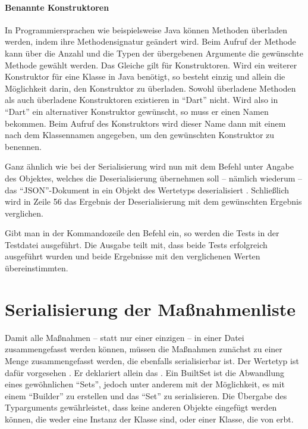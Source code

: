 \paragraph{Benannte Konstruktoren} In Programmiersprachen wie beispielsweise Java können Methoden überladen werden, indem ihre Methodensignatur geändert wird.
Beim Aufruf der Methode kann über die Anzahl und die Typen der übergebenen Argumente die gewünschte Methode gewählt werden.
Das Gleiche gilt für Konstruktoren.
Wird ein weiterer Konstruktor für eine Klasse in Java benötigt, so besteht einzig und allein die Möglichkeit darin, den Konstruktor zu überladen.
Sowohl überladene Methoden als auch überladene Konstruktoren existieren in \enquote{Dart} nicht.
Wird also in \enquote{Dart} ein alternativer Konstruktor gewünscht, so muss er einen Namen bekommen.
Beim Aufruf des Konstruktors wird dieser Name dann mit einem  nach dem Klassennamen angegeben, um den gewünschten Konstruktor zu benennen.


Ganz ähnlich wie bei der Serialisierung wird nun mit dem Befehl    unter Angabe des Objektes,
welches die Deserialisierung übernehmen soll -- nämlich wiederum  -- das \enquote{JSON}-Dokument in ein Objekt des Wertetyps  deserialisiert .
Schließlich wird in Zeile 56 das Ergebnis der Deserialisierung mit dem gewünschten Ergebnis verglichen.



Gibt man in der Kommandozeile den Befehl    ein,
so werden die Tests in der Testdatei ausgeführt.
Die Ausgabe  teilt mit,
dass beide Tests erfolgreich ausgeführt wurden und beide Ergebnisse mit den verglichenen Werten übereinstimmten.

\clearpage
\section{Serialisierung der Maßnahmenliste}

Damit alle Maßnahmen -- statt nur einer einzigen -- in einer Datei zusammengefasst werden können, müssen die Maßnahmen zunächst zu einer Menge zusammengefasst werden, die ebenfalls serialisierbar ist.
Der Wertetyp  ist dafür vorgesehen \Lst{\ref{lst:Schritt1WerteTypStorage}}.
Er deklariert allein das  .
Ein BuiltSet ist die Abwandlung eines gewöhnlichen \enquote{Sets}, jedoch unter anderem mit der Möglichkeit, es mit einem \enquote{Builder} zu erstellen und das \enquote{Set} zu serialisieren.
Die Übergabe des Typarguments  gewährleistet, dass keine anderen Objekte eingefügt werden können, die weder eine Instanz der Klasse  sind, oder einer Klasse, die von  erbt.


